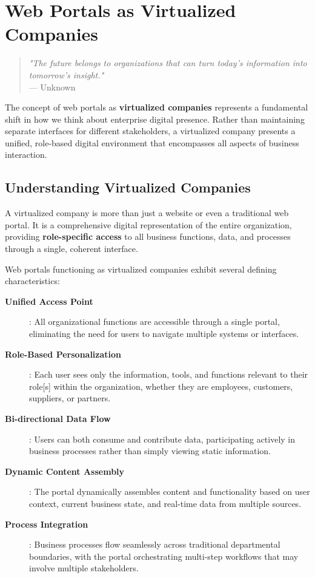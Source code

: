 
\chapter{Web Portals as Virtualized Companies}
\label{chap:virtualized-companies}

\begin{quote}
\textit{"The future belongs to organizations that can turn today's information into tomorrow's insight."} \\
— Unknown
\end{quote}

The concept of web portals as \textbf{virtualized companies} represents a fundamental shift in how we think about enterprise digital presence. Rather than maintaining separate interfaces for different stakeholders, a virtualized company presents a unified, role-based digital environment that encompasses all aspects of business interaction.

\section{Understanding Virtualized Companies}
\label{sec:understanding-virtualized}

A virtualized company is more than just a website or even a traditional web portal. It is a comprehensive digital representation of the entire organization, providing \textbf{role-specific access} to all business functions, data, and processes through a single, coherent interface.

Web portals functioning as virtualized companies exhibit several defining characteristics:

\begin{description}
\item[\textbf{Unified Access Point}]: All organizational functions are accessible through a single portal, eliminating the need for users to navigate multiple systems or interfaces.

\item[\textbf{Role-Based Personalization}]: Each user sees only the information, tools, and functions relevant to their role[s] within the organization, whether they are employees, customers, suppliers, or partners.

\item[\textbf{Bi-directional Data Flow}]: Users can both consume and contribute data, participating actively in business processes rather than simply viewing static information.

\item[\textbf{Dynamic Content Assembly}]: The portal dynamically assembles content and functionality based on user context, current business state, and real-time data from multiple sources.

\item[\textbf{Process Integration}]: Business processes flow seamlessly across traditional departmental boundaries, with the portal orchestrating multi-step workflows that may involve multiple stakeholders.
\end{description}

